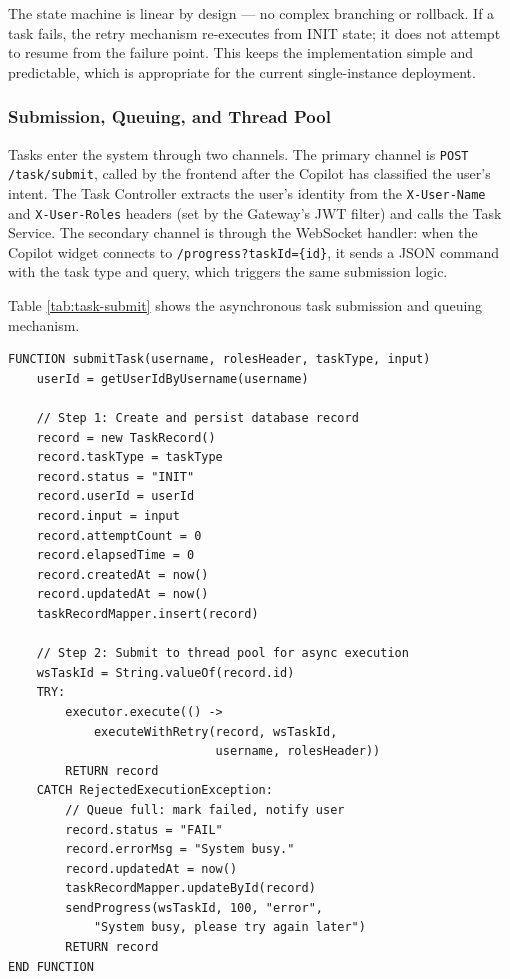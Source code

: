 The state machine is linear by design --- no complex branching or rollback. If a task fails, the retry mechanism re-executes from INIT state; it does not attempt to resume from the failure point. This keeps the implementation simple and predictable, which is appropriate for the current single-instance deployment.

\subsubsection{Submission, Queuing, and Thread Pool}

Tasks enter the system through two channels. The primary channel is \texttt{POST /task/submit}, called by the frontend after the Copilot has classified the user's intent. The Task Controller extracts the user's identity from the \texttt{X-User-Name} and \texttt{X-User-Roles} headers (set by the Gateway's JWT filter) and calls the Task Service. The secondary channel is through the WebSocket handler: when the Copilot widget connects to \texttt{/progress?taskId=\{id\}}, it sends a JSON command with the task type and query, which triggers the same submission logic.

Table \ref{tab:task-submit} shows the asynchronous task submission and queuing mechanism.

\vspace{3mm}
\begin{table}[H]
\small\singlespacing
\centering
\caption{Pseudocode --- submitTask() Asynchronous Task Submission and Queuing}
\label{tab:task-submit}
\vspace{2mm}

\begin{lstlisting}
FUNCTION submitTask(username, rolesHeader, taskType, input)
    userId = getUserIdByUsername(username)

    // Step 1: Create and persist database record
    record = new TaskRecord()
    record.taskType = taskType
    record.status = "INIT"
    record.userId = userId
    record.input = input
    record.attemptCount = 0
    record.elapsedTime = 0
    record.createdAt = now()
    record.updatedAt = now()
    taskRecordMapper.insert(record)

    // Step 2: Submit to thread pool for async execution
    wsTaskId = String.valueOf(record.id)
    TRY:
        executor.execute(() ->
            executeWithRetry(record, wsTaskId,
                             username, rolesHeader))
        RETURN record
    CATCH RejectedExecutionException:
        // Queue full: mark failed, notify user
        record.status = "FAIL"
        record.errorMsg = "System busy."
        record.updatedAt = now()
        taskRecordMapper.updateById(record)
        sendProgress(wsTaskId, 100, "error",
            "System busy, please try again later")
        RETURN record
END FUNCTION
\end{lstlisting}
\end{table}

